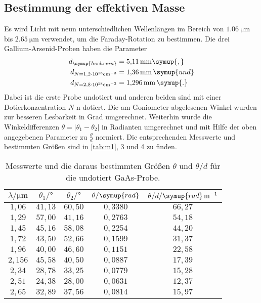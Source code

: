 \subsection{Bestimmung der effektiven Masse}
Es wird Licht mit neun unterschiedlichen Wellenlängen im Bereich von $\SI{1,06}{\micro\meter}$ bis
$\SI{2,65}{\micro\meter}$ verwendet, um die Faraday-Rotation zu bestimmen. Die drei Gallium-Arsenid-Proben haben
die Parameter
\begin{align*}
  d_{\symup{hochrein}} &= \SI{5,11}{\milli\meter}\symup{,} \\
  d_{N=1,2 \cdot 10^{18} \si{cm}^{-3}} &= \SI{1,36}{\milli\meter}\,\symup{ und} \\
  d_{N=2,8 \cdot 10^{18} \si{cm}^{-3}} &= \SI{1,296}{\milli\meter}\,\symup{.}
\end{align*}
Dabei ist die erste Probe undotiert und anderen beiden sind mit einer Dotierkonzentration $N$ n-dotiert.
Die am Goniometer abgelesenen Winkel wurden zur besseren Lesbarkeit in Grad umgerechnet. Weiterhin wurde die
Winkeldifferenzen $\theta = |\theta_{1} - \theta_{2}|$ in Radianten umgerechnet und mit Hilfe der oben angegebenen
Parameter zu $\frac{\theta}{d}$ normiert.
Die entsprechenden Messwerte und bestimmten Größen sind in \autoref{tab:m1}, 3 und 4 zu finden.
\begin{table}
  \centering
  \caption{Messwerte und die daraus bestimmten Größen $\theta$ und $\theta/d$ für die undotiert GaAs-Probe.}
  \label{tab:m1}
  \begin{tabular}{c c c c c}
    \toprule
    $\lambda/\si{\micro\meter}$ & $\theta_{1}/\si{\degree}$ & $\theta_{2}/\si{\degree}$ & $\theta/\symup{rad}$ & $\theta/d/\symup{rad}\, \si{m}^{-1}$\\
    \midrule
    $1,06 $ & $41,13$ & $60,50$ & $0,3380$ & $66,27$ \\
    $1,29 $ & $57,00$ & $41,16$ & $0,2763$ & $54,18$ \\
    $1,45 $ & $45,16$ & $58,08$ & $0,2254$ & $44,20$ \\
    $1,72 $ & $43,50$ & $52,66$ & $0,1599$ & $31,37$ \\
    $1,96 $ & $40,00$ & $46,60$ & $0,1151$ & $22,58$ \\
    $2,156$ & $45,58$ & $40,50$ & $0,0887$ & $17,39$ \\
    $2,34 $ & $28,78$ & $33,25$ & $0,0779$ & $15,28$ \\
    $2,51 $ & $24,38$ & $28,00$ & $0,0631$ & $12,37$ \\
    $2,65 $ & $32,89$ & $37,56$ & $0,0814$ & $15,97$ \\
    \bottomrule
  \end{tabular}
\end{table}

